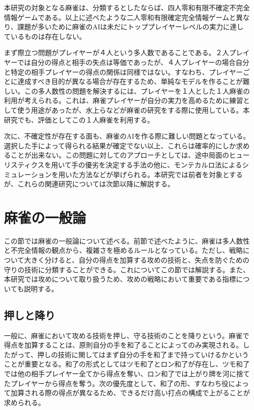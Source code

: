 本研究の対象となる麻雀は、分類するとしたならば、四人零和有限不確定不完全情報ゲームである。以上に述べたような二人零和有限確定完全情報ゲームと異なり、課題が多いために麻雀のAIは未だにトッププレイヤーレベルの実力に達しているものは存在しない。

まず際立つ問題がプレイヤーが４人という多人数であることである。２人プレイヤーでは自分の得点と相手の失点は等価であったが、４人プレイヤーの場合自分と特定の相手プレイヤーの得点の関係は同様ではない。すなわち、プレイヤーごとに達成すべき目的が異なる場合が存在するため、単純なモデルを作ることが難しい。この多人数性の問題を解決するには、プレイヤーを１人とした１人麻雀の利用が考えられる。これは、麻雀プレイヤーが自分の実力を高めるために練習として使う用途があったが、水上ら\cite{bakuuti2013}などが麻雀の研究をする際に使用している。本研究でも、評価としてこの１人麻雀を利用する。

次に、不確定性が存在する面も、麻雀のAIを作る際に難しい問題となっている。選択した手によって得られる結果が確定でない以上、これらは確率的にしか求めることが出来ない。この問題に対してのアプローチとしては、途中局面のヒューリスティクスを用いて手の優劣を決定する手法の他に、モンテカルロ法によるシミュレーションを用いた方法などが挙げられる。本研究では前者を対象とするが、これらの関連研究については次節以降に解説する。


\section{麻雀の一般論}
この節では麻雀の一般論について述べる。前節で述べたように、麻雀は多人数性と不完全情報の観点から、複雑さを極めるルールとなっている。ただし、戦略について大きく分けると、自分の得点を加算する攻めの技術と、失点を防ぐための守りの技術に分類することができる。これについてこの節では解説する。また、本研究では攻めについて取り扱うため、攻めの戦略において重要である指標についても説明する。
\subsection{押しと降り}
一般に、麻雀において攻める技術を押し、守る技術のことを降りという。麻雀で得点を加算することは、原則自分の手を和了ることによってのみ実現される。したがって、押しの技術に関してはまず自分の手を和了まで持っていけるかということが重要となる。和了の形式としてはツモ和了とロン和了が存在し、ツモ和了では他の相手プレイヤー全てから得点を奪い、ロン和了では上がり牌を河に捨てたプレイヤーから得点を奪う。次の優先度として、和了の形、すなわち役によって加算される際の得点が異なるため、できるだけ高い打点の構成で上がることが求められる。

